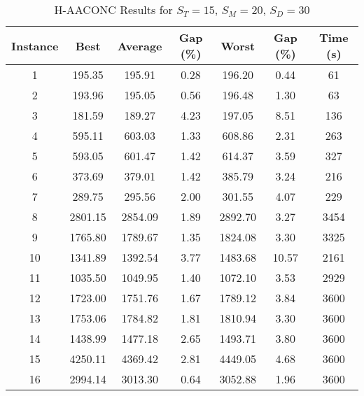 \begin{table}[h]
	\centering
	\caption{H-AACONC Results for $S_T=15$, $S_M=20$, $S_D=30$}
	\begin{tabular}{@{}ccccccc@{}}
		\midrule
		\textbf{Instance} & \textbf{Best} & \textbf{Average} & \textbf{Gap (\%)} & \textbf{Worst} & \textbf{Gap (\%)} & \textbf{Time (s)} \\ \midrule
		1  & 195.35 & 195.91 & 0.28 & 196.20 & 0.44 & 61   \\ \midrule
		2  & 193.96 & 195.05 & 0.56 & 196.48 & 1.30 & 63 \\ \midrule
		3  & 181.59 & 189.27 & 4.23 & 197.05 & 8.51 & 136 \\ \midrule
		4  & 595.11 & 603.03 & 1.33 & 608.86 & 2.31 & 263 \\ \midrule
		5  & 593.05 & 601.47 & 1.42 & 614.37 & 3.59 & 327 \\ \midrule
		6  & 373.69 & 379.01 & 1.42 & 385.79 & 3.24 & 216 \\ \midrule
		7  & 289.75 & 295.56 & 2.00 & 301.55 & 4.07 & 229 \\ \midrule
		8  & 2801.15 & 2854.09 & 1.89 & 2892.70 & 3.27 & 3454 \\ \midrule
		9  & 1765.80 & 1789.67 & 1.35 & 1824.08 & 3.30 & 3325 \\ \midrule
		10 & 1341.89 & 1392.54 & 3.77 & 1483.68 & 10.57 & 2161 \\ \midrule
		11 & 1035.50 & 1049.95 & 1.40 & 1072.10 & 3.53 & 2929 \\ \midrule
		12 & 1723.00 & 1751.76 & 1.67 & 1789.12 & 3.84 & 3600 \\ \midrule
		13 & 1753.06 & 1784.82 & 1.81 & 1810.94 & 3.30 & 3600 \\ \midrule
		14 & 1438.99 & 1477.18 & 2.65 & 1493.71 & 3.80 & 3600 \\ \midrule
		15 & 4250.11 & 4369.42 & 2.81 & 4449.05 & 4.68 & 3600 \\ \midrule
		16 & 2994.14 & 3013.30 & 0.64 & 3052.88 & 1.96 & 3600 \\ \midrule
	\end{tabular}
	\label{table:ACO_15-20-30}
\end{table}
